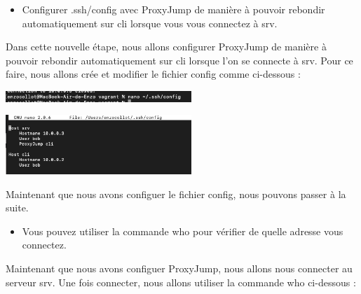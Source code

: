 \documentclass[12pt]{article}
\begin{document}
\vspace{0.3cm}

\begin{itemize}
  \item Configurer .ssh/config avec ProxyJump de manière à pouvoir rebondir automatiquement sur cli lorsque vous vous connectez à srv.
\end{itemize}

\vspace{0.3cm}

Dans cette nouvelle étape, nous allons configurer ProxyJump de manière à pouvoir rebondir automatiquement sur cli lorsque l'on se connecte à srv. Pour ce faire, nous allons crée et modifier le fichier config comme ci-dessous : 

\vspace{0.3cm}

\begin{center}
  \includegraphics[width=7cm]{Image-TD-SSH-8/nano-config.png}
\end{center}

\vspace{0.3cm}

\begin{center}
  \includegraphics[width=7cm]{Image-TD-SSH-8/ProxyJump.png}
\end{center}

\vspace{0.3cm}

Maintenant que nous avons configuer le fichier config, nous pouvons passer à la suite.

\vspace{0.3cm}

\begin{itemize}
  \item Vous pouvez utiliser la commande who pour vérifier de quelle adresse vous connectez.
\end{itemize}

\vspace{0.3cm}

Maintenant que nous avons configuer ProxyJump, nous allons nous connecter au serveur srv. Une fois connecter, nous allons utiliser la commande who ci-dessous : 
\end{document}

